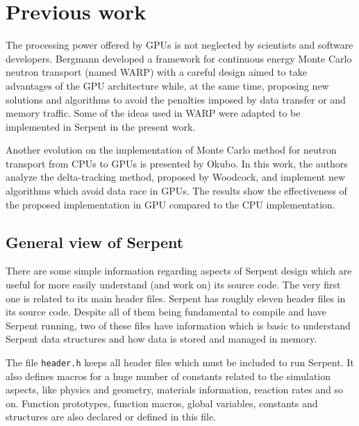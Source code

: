 \documentclass[twoside,a4paper,12pt,english,draft]{anstrans}
\begin{document}
\section{Previous work}

The processing power offered by GPUs is not neglected by scientists and software developers.
Bergmann\cite{Bergmann2014} developed a framework for continuous energy Monte Carlo neutron
transport (named WARP) with a careful design aimed to take advantages of the GPU architecture while, at the
same time, proposing new solutions and algorithms to avoid the penalties imposed by data transfer
or and memory traffic. Some of the ideas used in WARP were adapted to be implemented in Serpent in
the present work.

Another evolution on the implementation of Monte Carlo method for neutron transport from CPUs to GPUs
is presented by Okubo\cite{Okubo2016}. In this work, the authors analyze the delta-tracking method,
proposed by Woodcock\cite{Woodcock1965}, and implement new algorithms which avoid data race in
GPUs. The results show the effectiveness of the proposed implementation in GPU compared to the CPU
implementation.


\subsection{General view of Serpent}

There are some simple information regarding aspects of Serpent design which are
useful for more easily understand (and work on) its source code. The very first one is related to its
main header files. Serpent has roughly eleven header files in its source code. Despite all of them
being fundamental to compile and have Serpent running, two of these files have information which
is basic to understand Serpent data structures and how data is stored and managed in memory.

The file \texttt{header.h} keeps all header files which must be included to run Serpent.
It also defines macros for a huge number of constants related to the simulation aspects, like
physics and geometry, materials information, reaction rates and so on. Function prototypes, function
macros, global variables, constants and structures are also declared or defined in this file.
\end{document}
